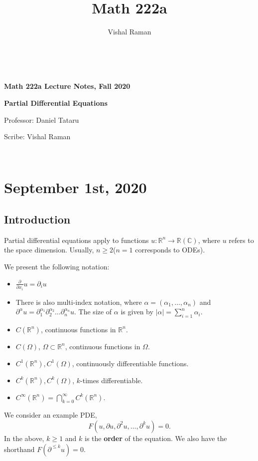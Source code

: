 \documentclass[12pt]{scrartcl}
\newcommand{\R}{\mathbb{R}}
\newcommand{\C}{\mathbb C}
\begin{document}
\title{Math 222a}
\author{Vishal Raman}
\thispagestyle{empty}
$ $
\vfill
\begin{center}

\centerline{\huge \textbf{Math 222a Lecture Notes, Fall 2020}}
\centerline{\Large \textbf{Partial Differential Equations} } 
\centerline{Professor: Daniel Tataru}
\centerline{Scribe: Vishal Raman}
\end{center}
\vfill
$ $
\newpage
\thispagestyle{empty}
\tableofcontents
\newpage
\section{September 1st, 2020}
\subsection{Introduction}
Partial differential equations apply to functions $u: \R^n \rightarrow \R(\C)$, where $u$ refers to the space dimension.  Usually, $n \ge 2$($n=1$ corresponds to ODEs).   

We present the following notation: \begin{itemize}
\item $\frac{\partial}{\partial x_i} u = \partial_i u$
\item There is also multi-index notation, where $\alpha = (\alpha_1, \dots, \alpha_n)$ and $\partial^\alpha u = \partial_1^{\alpha_1}\partial_2^{\alpha_2} \dots \partial_n^{\alpha_n} u$.  The size of $\alpha$ is given by $|\alpha| = \sum_{i=1}^n \alpha_i$.
\item $C(\R^n)$, continuous functions in $\R^n$.
\item $C(\Omega)$, $\Omega \subset \R^n$, continuous functions in $\Omega$.
\item $C^1(\R^n), C^1(\Omega)$, continuously differentiable functions.
\item $C^k(\R^n), C^k(\Omega)$, $k$-times differentiable.
\item $C^\infty(\R^n) = \bigcap_{k=0}^{\infty} C^k(\R^n)$.
\end{itemize}

We consider an example PDE, 
$$F(u, \partial u, \partial^2 u, \dots, \partial^k u) = 0.$$
In the above, $k \ge 1$ and $k$ is the \textbf{order} of the equation.  We also have the shorthand $F(\partial ^{\le k}u) = 0$.  
\end{document}
